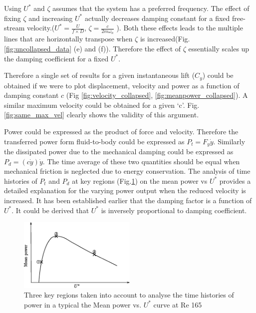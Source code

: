  Using $U^*$ and $\zeta$ assumes that the system has a preferred frequency. The effect of fixing $\zeta$ and increasing $U^*$ actually decreases damping constant for a fixed free-stream velocity.($U^*=\frac{U}{f \times D}$, $\zeta= \frac{c}{2 m \omega_n}$ ). Both these effects leads to the multiple lines that are horizontally transpose when $\zeta$ is increased(Fig.\ref{fig:uncollapsed_data} (e) and (f)). Therefore the effect of $\zeta$ essentially scales up the damping coefficient for a fixed $U^*$. 
 \vspace{1cm}
 
 Therefore a single set of results for a given instantaneous lift ($C_y$) could be obtained if we were to plot displacement, velocity and power as a function of damping constant $c$ (Fig \ref{fig:velocity_collapsed}, \ref{fig:meanpower_collapsed}). A similar maximum velocity could be obtained for a given `c'. Fig.\ref{fig:same_max_vel} clearly shows the validity of this argument. 
 


 



 
 Power could be expressed as the product of force and velocity. Therefore the transferred power form fluid-to-body could be expressed as $P_t=F_y\dot{y}$. Similarly the dissipated power due to the mechanical damping could be expressed as $P_d=(c\dot{y})\dot{y}$. The time average of these two quantities should be equal when mechanical friction is neglected due to energy conservation. The analysis of time histories of $P_t $ and $P_d$ at key regions (Fig.\ref{fig:regions_1}) on the mean power vs $U^*$ provides a detailed explanation for the varying power output when the reduced velocity is increased. It has been established earlier that the damping factor is a function of $U^*$. It could be derived that $U^*$ is inversely proportional to damping coefficient. 

\begin{figure}[h!]
\centering
\includegraphics[width=0.5\textwidth]{../FnP/sketch_1}
\caption{ Three key regions taken into account to analyse the time histories of power in a typical the Mean power vs. $U^*$ curve at Re 165 }
\label{fig:regions_1}
\end{figure}


